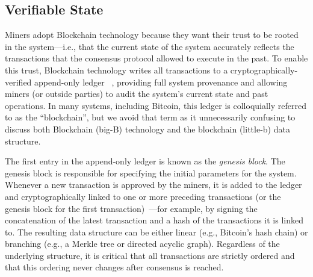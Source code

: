 \subsection{Verifiable State}
Miners adopt Blockchain technology because they want their trust to be rooted in the system---i.e., that the current state of the system accurately reflects the transactions that the consensus protocol allowed to execute in the past.
To enable this trust, Blockchain technology writes all transactions to a cryptographically-verified append-only ledger ~\cite{tamassia2003authenticated}, providing full system provenance and allowing miners (or outside parties) to audit the system's current state and past operations.
In many systems, including Bitcoin, this ledger is colloquially referred to as the ``blockchain'', but we avoid that term as it unnecessarily confusing to discuss both Blockchain (big-B) technology and the blockchain (little-b) data structure.

The first entry in the append-only ledger is known as the \emph{genesis block}.
The genesis block is responsible for specifying the initial parameters for the system.
Whenever a new transaction is approved by the miners, it is added to the ledger and cryptographically linked to one or more preceding transactions (or the genesis block for the first transaction)~\cite{bayer1993improving,haber1990time,haber1997secure}---for example, by signing the concatenation of the latest transaction and a hash of the transactions it is linked to.
The resulting data structure can be either linear (e.g., Bitcoin's hash chain) or branching (e.g., a Merkle tree or directed acyclic graph).
Regardless of the underlying structure, it is critical that all transactions are strictly ordered and that this ordering never changes after consensus is reached.


